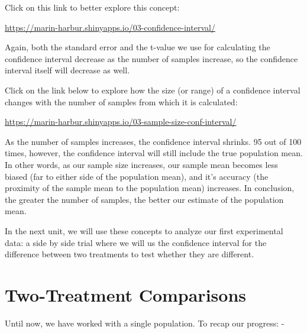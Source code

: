 \documentclass[
]{book}
\begin{document}
Click on this link to better explore this concept:

\url{https://marin-harbur.shinyapps.io/03-confidence-interval/}

Again, both the standard error and the t-value we use for calculating
the confidence interval decrease as the number of samples increase, so
the confidence interval itself will decrease as well.

Click on the link below to explore how the size (or range) of a
confidence interval changes with the number of samples from which it is
calculated:

\url{https://marin-harbur.shinyapps.io/03-sample-size-conf-interval/}

As the number of samples increases, the confidence interval shrinks. 95
out of 100 times, however, the confidence interval will still include
the true population mean. In other words, as our sample size increases,
our sample mean becomes less biased (far to either side of the
population mean), and it's accuracy (the proximity of the sample mean to
the population mean) increases. In conclusion, the greater the number of
samples, the better our estimate of the population mean.

In the next unit, we will use these concepts to analyze our first
experimental data: a side by side trial where we will us the confidence
interval for the difference between two treatments to test whether they
are different.

\hypertarget{two-treatment-comparisons}{%
\chapter{Two-Treatment Comparisons}\label{two-treatment-comparisons}}

Until now, we have worked with a single population. To recap our
progress: -
\end{document}
